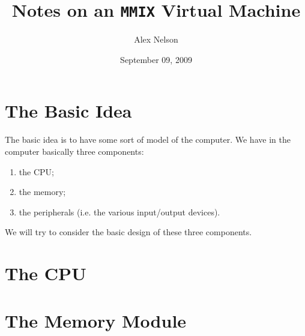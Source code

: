 \documentclass{article}
\title{Notes on an {\tt MMIX} Virtual Machine}
\date{September 09, 2009}
\author{Alex Nelson}
\numberwithin{algorithm}{section}
\begin{document}
\maketitle

\section{The Basic Idea}

The basic idea is to have some sort of model of the computer. We
have in the computer basically three components:
\begin{enumerate}
\item the CPU;
\item the memory;
\item the peripherals (i.e. the various input/output devices).
\end{enumerate}
We will try to consider the basic design of these three
components.

\section{The CPU}


\section{The Memory Module}





\end{document}
